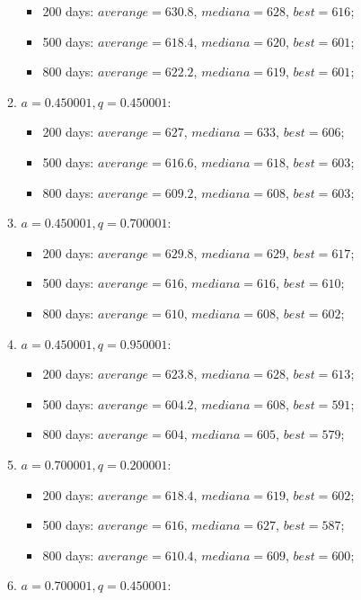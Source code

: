 \begin{enumerate}
\begin{enumerate}
		\begin{itemize}
			\item 200 days: $averange =  630.8$, $mediana =  628$, $best = 616$;
			\item 500 days: $averange =  618.4$, $mediana =  620$, $best = 601$;
			\item 800 days: $averange =  622.2$, $mediana =  619$, $best = 601$;
		\end{itemize}
		\item $a= 0.450001, q= 0.450001$:
		\begin{itemize}
			\item 200 days: $averange =  627$, $mediana =  633$, $best = 606$;
			\item 500 days: $averange =  616.6$, $mediana =  618$, $best = 603$;
			\item 800 days: $averange =  609.2$, $mediana =  608$, $best = 603$;
		\end{itemize}
		\item $a= 0.450001, q= 0.700001$:
		\begin{itemize}
			\item 200 days: $averange =  629.8$, $mediana =  629$, $best = 617$;
			\item 500 days: $averange =  616$, $mediana =  616$, $best = 610$;
			\item 800 days: $averange =  610$, $mediana =  608$, $best = 602$;
		\end{itemize}
		\item $a= 0.450001, q= 0.950001$:
		\begin{itemize}
			\item 200 days: $averange =  623.8$, $mediana =  628$, $best = 613$;
			\item 500 days: $averange =  604.2$, $mediana =  608$, $best = 591$;
			\item 800 days: $averange =  604$, $mediana =  605$, $best = 579$;
		\end{itemize}
		\item $a= 0.700001, q= 0.200001$:
		\begin{itemize}
			\item 200 days: $averange =  618.4$, $mediana =  619$, $best = 602$;
			\item 500 days: $averange =  616$, $mediana =  627$, $best = 587$;
			\item 800 days: $averange =  610.4$, $mediana =  609$, $best = 600$;
		\end{itemize}
		\item $a= 0.700001, q= 0.450001$:

\end{enumerate}
\end{enumerate}
